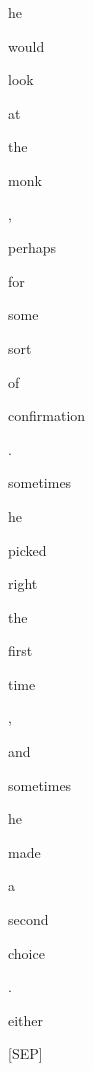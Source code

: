 \documentclass[varwidth=150mm]{standalone}
\begin{document}
\begin{CJK*}{UTF8}{gbsn}
{{{\colorbox{red!5.479572772979736}{\strut he} \colorbox{red!5.20026969909668}{\strut would} \colorbox{red!0.0}{\strut look} \colorbox{red!0.0}{\strut at} \colorbox{red!0.0}{\strut the} \colorbox{red!4.643859386444092}{\strut monk} \colorbox{red!2.926654577255249}{\strut ,} \colorbox{red!0.0}{\strut perhaps} \colorbox{red!0.0}{\strut for} \colorbox{red!1.1218822002410889}{\strut some} \colorbox{red!0.0}{\strut sort} \colorbox{red!1.4016849994659424}{\strut of} \colorbox{red!1.381787896156311}{\strut confirmation} \colorbox{red!0.0}{\strut .} \colorbox{red!1.1530362367630005}{\strut sometimes} \colorbox{red!3.216590404510498}{\strut he} \colorbox{red!0.0}{\strut picked} \colorbox{red!0.0}{\strut right} \colorbox{red!3.664616346359253}{\strut the} \colorbox{red!0.0}{\strut first} \colorbox{red!9.399249076843262}{\strut time} \colorbox{red!1.1729936599731445}{\strut ,} \colorbox{red!1.221116542816162}{\strut and} \colorbox{red!1.5823642015457153}{\strut sometimes} \colorbox{red!2.6171157360076904}{\strut he} \colorbox{red!0.0}{\strut made} \colorbox{red!0.0}{\strut a} \colorbox{red!0.0}{\strut second} \colorbox{red!1.7553871870040894}{\strut choice} \colorbox{red!0.0}{\strut .} \colorbox{red!0.0}{\strut either} \colorbox{red!0.0}{\strut [SEP]}
}}}
\end{CJK*}
\end{document}
